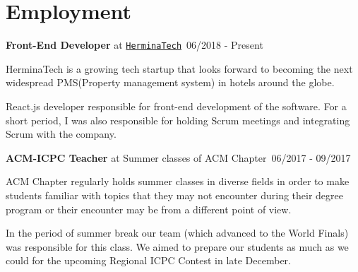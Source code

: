 \documentclass[letterpaper]{article}
\renewenvironment{itemize}{
  \begin{list}{}{
    \setlength{\leftmargin}{1.5em}
  }
}{
  \end{list}
}
\begin{document}
\section*{Employment}

\begin{itemize}

\item \textbf{Front-End Developer} at \href{https://herminatech.com}{\tt HerminaTech}{\ \scriptsize 06/2018 - Present}
    \begin{description}[style=nextline,before=\footnotesize]
        {\hspace*{10pt}HerminaTech is a growing tech startup that looks forward to becoming the next widespread PMS(Property management system) in hotels around the globe.}
    \end{description}
    \begin{description}[style=nextline,before=\normalsize,noitemsep,topsep=0pt]
        \item{\hspace*{8pt} \faCaretRight \hspace*{4pt}React.js developer responsible for front-end development of the software. For a short period, I was also responsible for holding Scrum meetings and integrating Scrum with the company.}
    \end{description}

\item \textbf{ACM-ICPC Teacher} at Summer classes of ACM Chapter{\ \scriptsize 06/2017 - 09/2017}
    \begin{description}[style=nextline,before=\footnotesize]
        {\hspace*{10pt}ACM Chapter regularly holds summer classes in diverse fields in order to make students familiar with topics that they may not encounter during their degree program or their encounter may be from a different point of view.}
    \end{description}
    \begin{description}[style=nextline,before=\normalsize,noitemsep,topsep=0pt]
        \item{\hspace*{8pt} \faCaretRight \hspace*{4pt}In the period of summer break our team (which advanced to the World Finals) was responsible for this class. We aimed to prepare our students as much as we could for the upcoming Regional ICPC Contest in late December.}
    \end{description}


\end{itemize}
\end{document}
